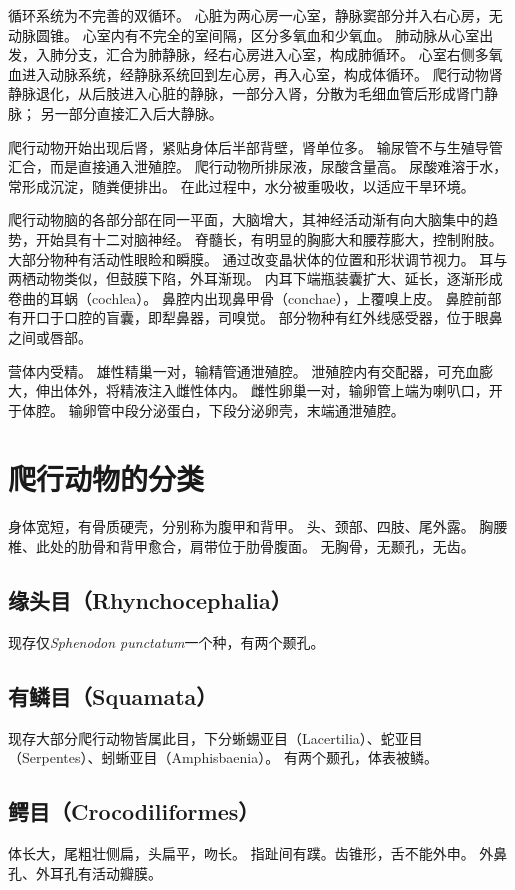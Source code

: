 \documentclass[11pt]{article}
\begin{document}
\newline

循环系统为不完善的双循环。
心脏为两心房一心室，静脉窦部分并入右心房，无动脉圆锥。
心室内有不完全的室间隔，区分多氧血和少氧血。
肺动脉从心室出发，入肺分支，汇合为肺静脉，经右心房进入心室，构成肺循环。
心室右侧多氧血进入动脉系统，经静脉系统回到左心房，再入心室，构成体循环。
爬行动物肾静脉退化，从后肢进入心脏的静脉，一部分入肾，分散为毛细血管后形成肾门静脉；
另一部分直接汇入后大静脉。

\newline

爬行动物开始出现后肾，紧贴身体后半部背壁，肾单位多。
输尿管不与生殖导管汇合，而是直接通入泄殖腔。
爬行动物所排尿液，尿酸含量高。
尿酸难溶于水，常形成沉淀，随粪便排出。
在此过程中，水分被重吸收，以适应干旱环境。

\newline

爬行动物脑的各部分部在同一平面，大脑增大，其神经活动渐有向大脑集中的趋势，开始具有十二对脑神经。
脊髓长，有明显的胸膨大和腰荐膨大，控制附肢。
大部分物种有活动性眼睑和瞬膜。
通过改变晶状体的位置和形状调节视力。
耳与两栖动物类似，但鼓膜下陷，外耳渐现。
内耳下端瓶装囊扩大、延长，逐渐形成卷曲的耳蜗（cochlea）。
鼻腔内出现鼻甲骨（conchae），上覆嗅上皮。
鼻腔前部有开口于口腔的盲囊，即犁鼻器，司嗅觉。
部分物种有红外线感受器，位于眼鼻之间或唇部。

\newline

营体内受精。
雄性精巢一对，输精管通泄殖腔。
泄殖腔内有交配器，可充血膨大，伸出体外，将精液注入雌性体内。
雌性卵巢一对，输卵管上端为喇叭口，开于体腔。
输卵管中段分泌蛋白，下段分泌卵壳，末端通泄殖腔。

\section{爬行动物的分类}
身体宽短，有骨质硬壳，分别称为腹甲和背甲。
头、颈部、四肢、尾外露。
胸腰椎、此处的肋骨和背甲愈合，肩带位于肋骨腹面。
无胸骨，无颞孔，无齿。

\subsection{缘头目（Rhynchocephalia）}
现存仅\textit{Sphenodon punctatum}一个种，有两个颞孔。

\subsection{有鳞目（Squamata）}
现存大部分爬行动物皆属此目，下分蜥蜴亚目（Lacertilia）、蛇亚目（Serpentes）、蚓蜥亚目（Amphisbaenia）。
有两个颞孔，体表被鳞。

\subsection{鳄目（Crocodiliformes）}
体长大，尾粗壮侧扁，头扁平，吻长。
指趾间有蹼。齿锥形，舌不能外申。
外鼻孔、外耳孔有活动瓣膜。
\end{document}

